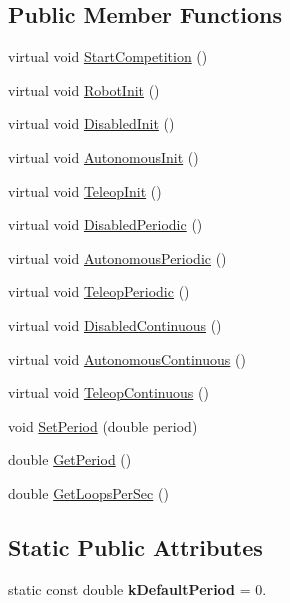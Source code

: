\subsection*{\-Public \-Member \-Functions}
\begin{DoxyCompactItemize}
\item 
virtual void \hyperlink{classIterativeRobot_ab0af04a781b0390981b9f0dd75358515}{\-Start\-Competition} ()
\item 
virtual void \hyperlink{classIterativeRobot_a5296334b4a48ad2123c29f49209b9f62}{\-Robot\-Init} ()
\item 
virtual void \hyperlink{classIterativeRobot_a428a5875274cb886730530d633a50db9}{\-Disabled\-Init} ()
\item 
virtual void \hyperlink{classIterativeRobot_aa936c0a4526e12e32defd50609cca90c}{\-Autonomous\-Init} ()
\item 
virtual void \hyperlink{classIterativeRobot_a7365e781f0a04674b94bb1fb5767d83e}{\-Teleop\-Init} ()
\item 
virtual void \hyperlink{classIterativeRobot_a00265f02550b12295ca2cffde2c9c838}{\-Disabled\-Periodic} ()
\item 
virtual void \hyperlink{classIterativeRobot_ac579e155cc4613ced00d5e740cf98667}{\-Autonomous\-Periodic} ()
\item 
virtual void \hyperlink{classIterativeRobot_a3336d7f71d644e646dba70839f4f4672}{\-Teleop\-Periodic} ()
\item 
virtual void \hyperlink{classIterativeRobot_a86e595ec2e7e645c8ae246243d6a16b8}{\-Disabled\-Continuous} ()
\item 
virtual void \hyperlink{classIterativeRobot_a766544e4b37b525b2a5d075e90e81b9e}{\-Autonomous\-Continuous} ()
\item 
virtual void \hyperlink{classIterativeRobot_afdfd6d7b231332af5d6277cb6e91bdfa}{\-Teleop\-Continuous} ()
\item 
void \hyperlink{classIterativeRobot_a1e49eb27408751ea8ce757bfe38717e2}{\-Set\-Period} (double period)
\item 
double \hyperlink{classIterativeRobot_a9752aaefce11839ea809b2a3326e937f}{\-Get\-Period} ()
\item 
double \hyperlink{classIterativeRobot_af8ada1ff1b92b0b678f1c959463cc460}{\-Get\-Loops\-Per\-Sec} ()
\end{DoxyCompactItemize}
\subsection*{\-Static \-Public \-Attributes}
\begin{DoxyCompactItemize}
\item 
\hypertarget{classIterativeRobot_af4d4e42da2c2c2b805c5d0d7452c7f00}{static const double {\bfseries k\-Default\-Period} = 0.}\label{classIterativeRobot_af4d4e42da2c2c2b805c5d0d7452c7f00}

\end{DoxyCompactItemize}
